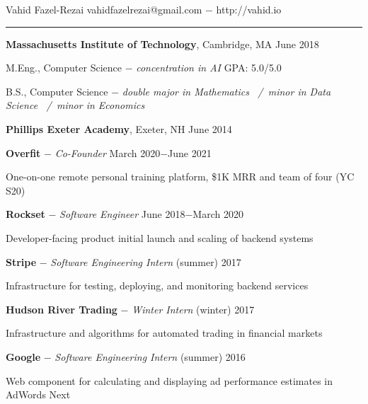 \documentclass[11pt]{article}
\newcommand{\msection}[1]{\vspace{1em}\hspace{-1.2in}\marginnote{#1}\vspace{-1.3em}} %
\newcommand{\bt}[1]{\textbf{#1}} %
\newcommand{\gap}[0]{\vspace{0.8em}} %
\newcommand{\dash}[0]{ $-$ } %
\newcommand{\tabsep}[0]{\, / \,} %
\begin{document}

{\Huge Vahid Fazel-Rezai} \hfill  vahidfazelrezai@gmail.com\dash http://vahid.io

\vspace{0.4em}

\hspace{-1.2in}\rule{7.9in}{0.2em}

\vspace{-0.2em}



\msection{Education}

\bt{Massachusetts Institute of Technology}, Cambridge, MA \hfill June 2018

M.Eng., Computer Science \dash \emph{concentration in AI} \hfill GPA: 5.0/5.0

B.S., Computer Science \dash \emph{double major in Mathematics \tabsep minor in Data Science \tabsep minor in Economics}

\gap

\bt{Phillips Exeter Academy}, Exeter, NH \hfill June 2014



\msection{Work}

\bt{Overfit}\dash \emph{Co-Founder} \hfill March 2020$-$June 2021

One-on-one remote personal training platform, \$1K MRR and team of four (YC S20)

\gap

\bt{Rockset}\dash \emph{Software Engineer} \hfill June 2018$-$March 2020

Developer-facing product initial launch and scaling of backend systems

\gap

\bt{Stripe}\dash \emph{Software Engineering Intern} \hfill (summer) 2017

Infrastructure for testing, deploying, and monitoring backend services

\gap

\bt{Hudson River Trading}\dash \emph{Winter Intern} \hfill (winter) 2017

Infrastructure and algorithms for automated trading in financial markets

\gap

\bt{Google}\dash \emph{Software Engineering Intern} \hfill (summer) 2016

Web component for calculating and displaying ad performance estimates in AdWords Next

\gap
\end{document}
